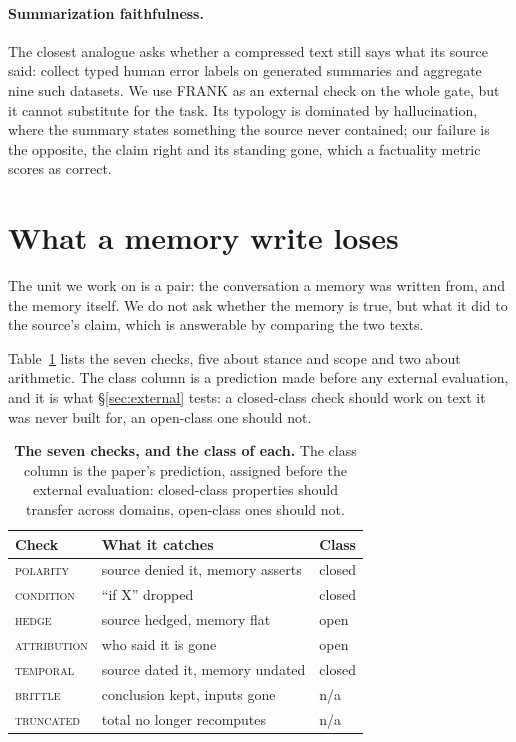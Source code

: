 \documentclass[11pt]{article}
\begin{document}
\paragraph{Summarization faithfulness.}
The closest analogue asks whether a compressed text still says what its source said:
\citet{pagnoni2021frank} collect typed human error labels on generated summaries and
\citet{tang2023aggrefact} aggregate nine such datasets. We use FRANK as an external
check on the whole gate, but it cannot substitute for the task. Its typology is
dominated by hallucination, where the summary states something the source never
contained; our failure is the opposite, the claim right and its standing gone, which a
factuality metric scores as correct.

\section{What a memory write loses}
\label{sec:problem}

The unit we work on is a pair: the conversation a memory was written from, and the memory
itself. We do not ask whether the memory is true, but what it did to the source's claim,
which is answerable by comparing the two texts.

Table~\ref{tab:checks} lists the seven checks, five about stance and scope and two about
arithmetic. The class column is a prediction made before any external evaluation, and it
is what \S\ref{sec:external} tests: a closed-class check should work on text it was never
built for, an open-class one should not.

\begin{table}[t]
\centering\small
\begin{tabular}{@{}lll@{}}
\toprule
Check & What it catches & Class \\
\midrule
\textsc{polarity} & source denied it, memory asserts & closed \\
\textsc{condition} & ``if X'' dropped & closed \\
\textsc{hedge} & source hedged, memory flat & open \\
\textsc{attribution} & who said it is gone & open \\
\textsc{temporal} & source dated it, memory undated & closed \\
\textsc{brittle} & conclusion kept, inputs gone & n/a \\
\textsc{truncated} & total no longer recomputes & n/a \\
\bottomrule
\end{tabular}
\caption{\textbf{The seven checks, and the class of each.} The class column is the
paper's prediction, assigned before the external evaluation: closed-class properties
should transfer across domains, open-class ones should not.}
\label{tab:checks}
\end{table}
\end{document}
